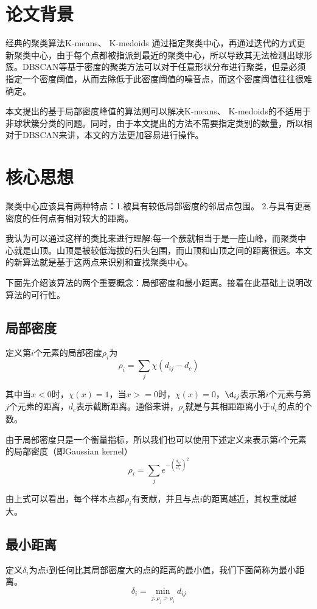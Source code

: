 \section{论文背景}
经典的聚类算法K-means、 K-medoids 通过指定聚类中心，再通过迭代的方式更新聚类中心，由于每个点都被指派到最近的聚类中心，所以导致其无法检测出球形簇。DBSCAN等基于密度的聚类方法可以对于任意形状分布进行聚类，但是必须指定一个密度阈值，从而去除低于此密度阈值的噪音点，而这个密度阈值往往很难确定。

本文提出的基于局部密度峰值的算法则可以解决K-means、 K-medoids的不适用于非球状簇分类的问题。同时，由于本文提出的方法不需要指定类别的数量，所以相对于DBSCAN来讲，本文的方法更加容易进行操作。

\section{核心思想}
聚类中心应该具有两种特点：1.被具有较低局部密度的邻居点包围。   2.与具有更高密度的任何点有相对较大的距离。

我认为可以通过这样的类比来进行理解:每一个蔟就相当于是一座山峰，而聚类中心就是山顶。山顶是被较低海拔的石头包围，而山顶和山顶之间的距离很远。本文的新算法就是基于这两点来识别和查找聚类中心。

下面先介绍该算法的两个重要概念：局部密度和最小距离。接着在此基础上说明改算法的可行性。

\subsection{局部密度}
定义第$i$个元素的局部密度$\rho_i$为
$$ \rho_i=\sum_{j} \chi(d_{ij}-d_c)$$

其中当$x<0$时，$\chi(x)=1$，当$x>=0$时，$\chi(x)=0$，$\d_{ij}$表示第$i$个元素与第$j$个元素的距离，$d_c$表示截断距离。通俗来讲，$\rho_i$就是与其相距距离小于$d_c$的点的个数。


由于局部密度只是一个衡量指标，所以我们也可以使用下述定义来表示第$i$个元素的局部密度（即Gaussian kernel）
$$ \rho_i=\sum_{j} e^{-{(\frac{d_{ij}}{d_c})^2}}$$

由上式可以看出，每个样本点都$\rho_i$有贡献，并且与点$i$的距离越近，其权重就越大。


\subsection{最小距离}
定义$\delta_i$为点$i$到任何比其局部密度大的点的距离的最小值，我们下面简称为最小距离。
$$ \delta_i = \min_{j:\rho_j>\rho_i}{d_{ij}} $$

